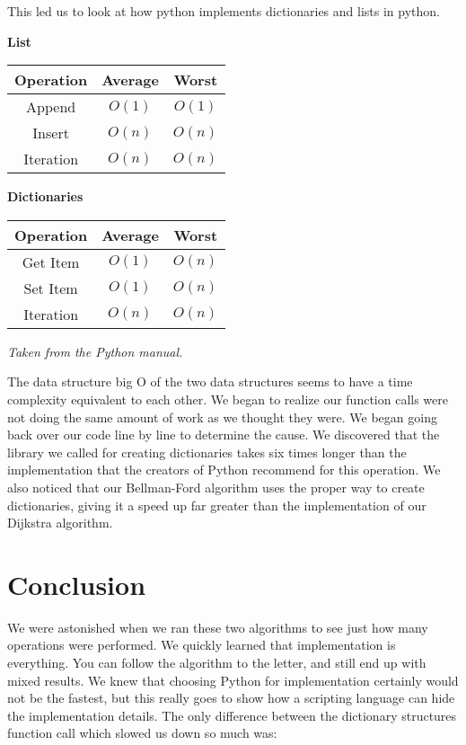 \documentclass{article}
\begin{document}
This led us to look at how python implements dictionaries and lists in python.
\begin{multicols}{2}

\hspace{35 pt} \textbf{List}\\
\centering
\begin{tabular}{||c|c|c||}
\hline
Operation & Average & Worst \\
\hline
Append & $O(1)$ & $O(1)$ \\
\hline
Insert & $O(n)$ & $O(n)$ \\
\hline
Iteration & $O(n)$  & $O(n)$ \\
\hline
\end{tabular}

\hspace{5 pt} \textbf{Dictionaries}\\
\centering
\begin{tabular}{||c|c|c||}
\hline
Operation & Average & Worst \\
\hline
Get Item & $O(1)$ & $O(n)$ \\
\hline
Set Item & $O(1)$ & $O(n)$ \\
\hline
Iteration & $O(n)$  & $O(n)$ \\
\hline
\end{tabular}
\end{multicols}
\hspace{50 mm} \textit{Taken from the Python manual.}

The data structure big O of the two data structures seems to have a time complexity equivalent to each other. 
We began to realize our function calls were not doing the same amount of work as we thought they were. We began going back over our code line by line to determine the cause. We discovered that the library we called for creating dictionaries takes six times longer than the implementation that the creators of Python recommend for this operation. We also noticed that our Bellman-Ford algorithm uses the proper way to create dictionaries, giving it a speed up far greater than the implementation of our Dijkstra algorithm.

\section{Conclusion}
We were astonished when we ran these two algorithms to see just how many operations were performed. We quickly learned that implementation is everything. You can follow the algorithm to the letter, and still end up with mixed results. We knew that choosing Python for implementation certainly would not be the fastest, but this really goes to show how a scripting language can hide the implementation details. The only difference between the dictionary structures function call which slowed us down so much was:
\end{document}
